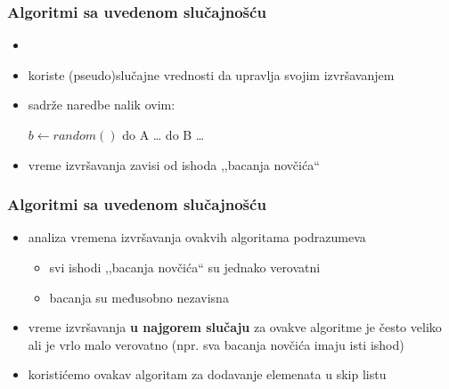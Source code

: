 \documentclass[compress]{beamer}
\begin{document}
\begin{frame}[fragile]
  \frametitle{Algoritmi sa uvedenom slučajnošću}
  \begin{itemize}
    \item {}
    \item koriste (pseudo)slučajne vrednosti da upravlja svojim izvršavanjem
    \item sadrže naredbe nalik ovim:
    \begin{algorithmic}
      \STATE $b \leftarrow random()$
        \STATE do A \ldots
      \ELSE
        \STATE do B \ldots
      \ENDIF
    \end{algorithmic}
    \item vreme izvršavanja zavisi od ishoda ,,bacanja novčića``
  \end{itemize}
\end{frame}

\begin{frame}[fragile]
  \frametitle{Algoritmi sa uvedenom slučajnošću}
  \begin{itemize}
    \item analiza vremena izvršavanja ovakvih algoritama podrazumeva 
    \begin{itemize}
      \item svi ishodi ,,bacanja novčića`` su jednako verovatni
      \item bacanja su međusobno nezavisna
    \end{itemize}
    \item vreme izvršavanja \textbf{u najgorem slučaju} za ovakve algoritme je često veliko ali je vrlo malo verovatno (npr. sva bacanja novčića imaju isti ishod)
    \item koristićemo ovakav algoritam za dodavanje elemenata u skip listu
  \end{itemize}
\end{frame}
\end{document}
